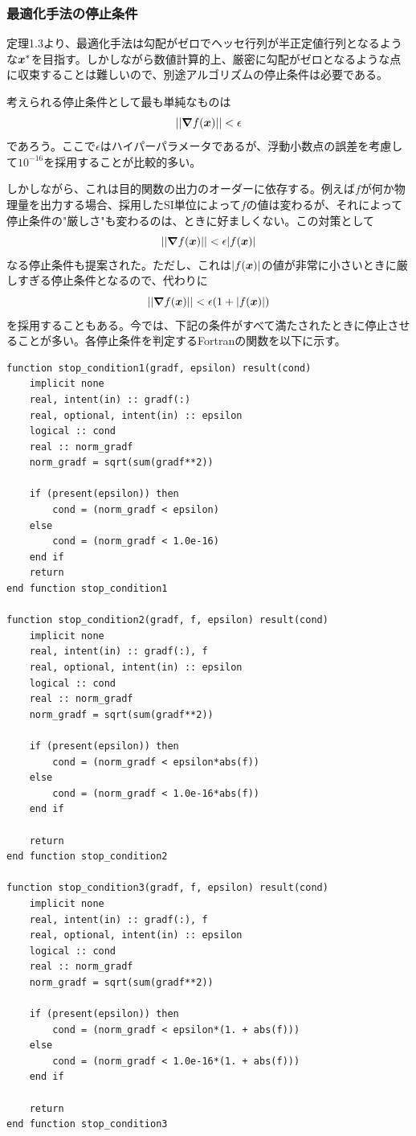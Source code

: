 \documentclass[dvipdfmx, 9pt, a4paper]{jsarticle}
\numberwithin{equation}{section}
\newcommand{\bm}[1]{{\mbox{\boldmath $#1$}}}
\begin{document}
\subsubsection{最適化手法の停止条件}
定理1.3より、最適化手法は勾配がゼロでヘッセ行列が半正定値行列となるような$\bm x^*$を目指す。しかしながら数値計算的上、厳密に勾配がゼロとなるような点に収束することは難しいので、別途アルゴリズムの停止条件は必要である。\par
考えられる停止条件として最も単純なものは
\begin{equation}
|| \bm \nabla f(\bm x) || < \epsilon \notag
\end{equation}
であろう。ここで$\epsilon$はハイパーパラメータであるが、浮動小数点の誤差を考慮して$10^{-16}$を採用することが比較的多い。\par
しかしながら、これは目的関数の出力のオーダーに依存する。例えば$f$が何か物理量を出力する場合、採用したSI単位によって$f$の値は変わるが、それによって停止条件の"厳しさ"も変わるのは、ときに好ましくない。この対策として
\begin{equation}
|| \bm \nabla f(\bm x) || < \epsilon|f(\bm x)| \notag
\end{equation}
なる停止条件も提案された。ただし、これは$|f(\bm x)|$の値が非常に小さいときに厳しすぎる停止条件となるので、代わりに
\begin{equation}
|| \bm \nabla f(\bm x) || < \epsilon(1+|f(\bm x)|) \notag
\end{equation}
を採用することもある。今では、下記の条件がすべて満たされたときに停止させることが多い。各停止条件を判定するFortranの関数を以下に示す。
\begin{lstlisting}[caption=停止条件]
function stop_condition1(gradf, epsilon) result(cond)
	implicit none
	real, intent(in) :: gradf(:)
	real, optional, intent(in) :: epsilon
	logical :: cond
	real :: norm_gradf
	norm_gradf = sqrt(sum(gradf**2))

	if (present(epsilon)) then
		cond = (norm_gradf < epsilon)
	else
		cond = (norm_gradf < 1.0e-16)
	end if
	return
end function stop_condition1

function stop_condition2(gradf, f, epsilon) result(cond)
	implicit none
	real, intent(in) :: gradf(:), f
	real, optional, intent(in) :: epsilon
	logical :: cond
	real :: norm_gradf
	norm_gradf = sqrt(sum(gradf**2))

	if (present(epsilon)) then
		cond = (norm_gradf < epsilon*abs(f))
	else
		cond = (norm_gradf < 1.0e-16*abs(f))
	end if

	return
end function stop_condition2

function stop_condition3(gradf, f, epsilon) result(cond)
	implicit none
	real, intent(in) :: gradf(:), f
	real, optional, intent(in) :: epsilon
	logical :: cond
	real :: norm_gradf
	norm_gradf = sqrt(sum(gradf**2))

	if (present(epsilon)) then
		cond = (norm_gradf < epsilon*(1. + abs(f)))
	else
		cond = (norm_gradf < 1.0e-16*(1. + abs(f)))
	end if

	return
end function stop_condition3
\end{lstlisting}
\end{document}
